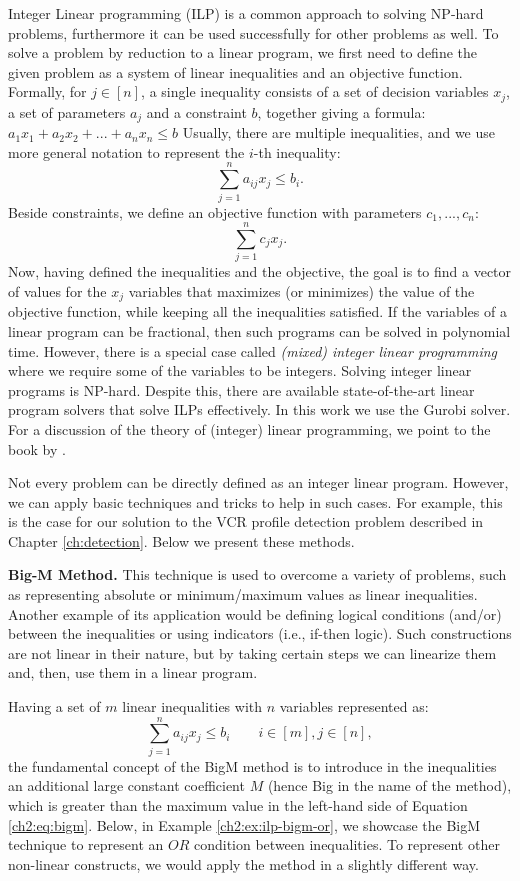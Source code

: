 Integer Linear programming (ILP) is a common approach to solving NP-hard problems, 
furthermore it can be used successfully for other problems as well.
To solve a problem by reduction to a linear program,
we first need to define the given problem as a system of linear inequalities and an objective function.
Formally, for $j \in [n]$, a single inequality consists of
a set of decision variables $x_j$,
a set of parameters $a_j$ and
a constraint $b$,
together giving a formula: $a_{1}x_{1} + a_{2}x_{2} + ... + a_{n}x_{n} \leq b$
Usually, there are multiple inequalities, and we use more general notation to represent the $i$-th inequality:
\[\sum_{j=1}^{n} a_{ij}x_{j} \leq b_{i}.\]
Beside constraints, we define an objective function with parameters $c_1, ..., c_n$:
\[\sum_{j=1}^{n} c_{j}x_{j}.\]
Now, having defined the inequalities and the objective, 
the goal is to find a vector of values for the $x_j$ variables that maximizes (or minimizes) the value of the objective function,
while keeping all the inequalities satisfied.
If the variables of a linear program can be fractional, then such programs can be solved in polynomial time.
However, there is a special case called \textit{(mixed) integer linear programming}
where we require some of the variables to be integers. Solving integer linear programs is NP-hard.
Despite this, there are available state-of-the-art linear program solvers that solve ILPs effectively.
In this work we use the Gurobi solver.
For a discussion of the theory of (integer) linear programming, we point to the book by \cite{ilp-book-wolsey}.

Not every problem can be directly defined as an integer linear program.
However, we can apply basic techniques and tricks to help in such cases.
For example, this is the case for our solution to the VCR profile detection problem described in Chapter \ref{ch:detection}.
Below we present these methods.
\newline

\noindent \textbf{Big-M Method.} \indent This technique is used to overcome a variety of problems,
such as representing absolute or minimum/maximum values as linear inequalities.
Another example of its application would be defining logical conditions (and/or) between the inequalities
or using indicators (i.e., if-then logic). Such constructions are not linear in their nature, but
by taking certain steps we can linearize them and, then, use them in a linear program.

Having a set of $m$ linear inequalities with $n$ variables represented as:
\begin{equation}\label{ch2:eq:bigm}
  \sum_{j=1}^{n} a_{ij}x_{j} \leq b_{i} \qquad i \in [m], j \in [n],
\end{equation}
the fundamental concept of the BigM method is to introduce in the inequalities
an additional large constant coefficient $M$ (hence Big in the name of the method),
which is greater than the maximum value in the left-hand side of Equation \ref{ch2:eq:bigm}.
Below, in Example \ref{ch2:ex:ilp-bigm-or}, we showcase the BigM technique to represent an $OR$ condition between inequalities.
To represent other non-linear constructs, we would apply the method in a slightly different way.

